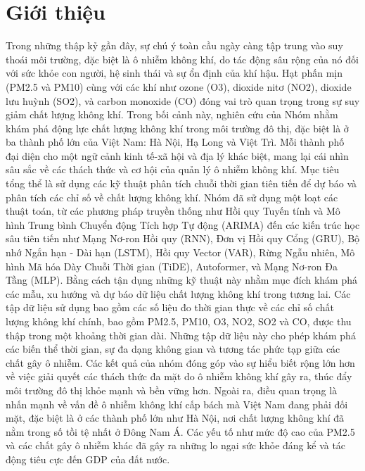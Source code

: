 \section{Giới thiệu}
Trong những thập kỷ gần đây, sự chú ý toàn cầu ngày càng tập trung vào suy thoái môi trường, đặc biệt là ô nhiễm không khí, do tác động sâu rộng của nó đối với sức khỏe con người, hệ sinh thái và sự ổn định của khí hậu. Hạt phấn mịn (PM2.5 và PM10) cùng với các khí như ozone (O3), dioxide nitơ (NO2), dioxide lưu huỳnh (SO2), và carbon monoxide (CO) đóng vai trò quan trọng trong sự suy giảm chất lượng không khí.
Trong bối cảnh này, nghiên cứu của Nhóm nhằm khám phá động lực chất lượng không khí trong môi trường đô thị, đặc biệt là ở ba thành phố lớn của Việt Nam: Hà Nội, Hạ Long và Việt Trì. Mỗi thành phố đại diện cho một ngữ cảnh kinh tế-xã hội và địa lý khác biệt, mang lại cái nhìn sâu sắc về các thách thức và cơ hội của quản lý ô nhiễm không khí.
Mục tiêu tổng thể là sử dụng các kỹ thuật phân tích chuỗi thời gian tiên tiến để dự báo và phân tích các chỉ số về chất lượng không khí. Nhóm đã sử dụng một loạt các thuật toán, từ các phương pháp truyền thống như Hồi quy Tuyến tính và Mô hình Trung bình Chuyển động Tích hợp Tự động (ARIMA) đến các kiến trúc học sâu tiên tiến như Mạng Nơ-ron Hồi quy (RNN), Đơn vị Hồi quy Cổng (GRU), Bộ nhớ Ngắn hạn - Dài hạn (LSTM), Hồi quy Vector (VAR), Rừng Ngẫu nhiên, Mô hình Mã hóa Dày Chuỗi Thời gian (TiDE), Autoformer, và Mạng Nơ-ron Đa Tầng (MLP). Bằng cách tận dụng những kỹ thuật này nhằm mục đích khám phá các mẫu, xu hướng và dự báo dữ liệu chất lượng không khí trong tương lai.
Các tập dữ liệu sử dụng bao gồm các số liệu đo thời gian thực về các chỉ số chất lượng không khí chính, bao gồm PM2.5, PM10, O3, NO2, SO2 và CO, được thu thập trong một khoảng thời gian dài. Những tập dữ liệu này cho phép khám phá các biến thể thời gian, sự đa dạng không gian và tương tác phức tạp giữa các chất gây ô nhiễm.
Các kết quả của nhóm đóng góp vào sự hiểu biết rộng lớn hơn về việc giải quyết các thách thức đa mặt do ô nhiễm không khí gây ra, thúc đẩy môi trường đô thị khỏe mạnh và bền vững hơn.
Ngoài ra, điều quan trọng là nhấn mạnh về vấn đề ô nhiễm không khí cấp bách mà Việt Nam đang phải đối mặt, đặc biệt là ở các thành phố lớn như Hà Nội, nơi chất lượng không khí đã nằm trong số tồi tệ nhất ở Đông Nam Á. Các yếu tố như mức độ cao của PM2.5 và các chất gây ô nhiễm khác đã gây ra những lo ngại sức khỏe đáng kể và tác động tiêu cực đến GDP của đất nước.